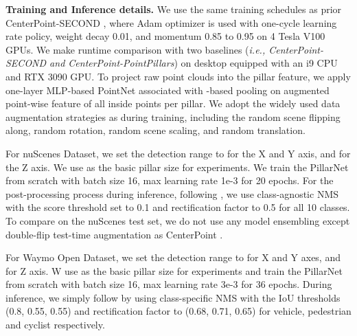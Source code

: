 \documentclass[runningheads]{llncs}
\begin{document}
{\flushleft \bf Training and Inference details.}
We use the same training schedules as prior CenterPoint-SECOND \cite{yin2021center}, where Adam optimizer is used with one-cycle learning rate policy, weight decay 0.01, and momentum 0.85 to 0.95 on 4 Tesla V100 GPUs.
We make runtime comparison with two baselines (\textit{i.e., CenterPoint-SECOND and CenterPoint-PointPillars}) on desktop equipped with an i9 CPU and RTX 3090 GPU.
To project raw point clouds into the pillar feature, we apply one-layer MLP-based PointNet associated with -based pooling on augmented point-wise feature of all inside points per pillar.
We adopt the widely used data augmentation strategies as \cite{yin2021center} during training, including the random scene flipping along, random rotation, random scene scaling, and random translation.



For nuScenes Dataset, 
we set the detection range to  for the X and Y axis, and  for the Z axis. 
We use  as the basic pillar size for experiments.
We train the PillarNet from scratch with batch size 16, max learning rate 1e-3 for 20 epochs.
For the post-processing process during inference, following \cite{yin2021center}, we use class-agnostic NMS with the score threshold set to 0.1 and rectification factor  to 0.5 for all 10 classes.
To compare on the nuScenes test set, we do not use any model ensembling except double-flip test-time augmentation as CenterPoint \cite{yin2021center}.

For Waymo Open Dataset, 
we set the detection range to  for X and Y axes, and  for Z axis.
W use  as the basic pillar size for experiments and train the PillarNet from scratch with batch size 16, max learning rate 3e-3 for 36 epochs.
During inference, we simply follow \cite{Hu2021AFDetV2RT} by using class-specific NMS with the IoU thresholds (0.8, 0.55, 0.55) and rectification factor  to (0.68, 0.71, 0.65) for vehicle, pedestrian and cyclist respectively.
\end{document}
